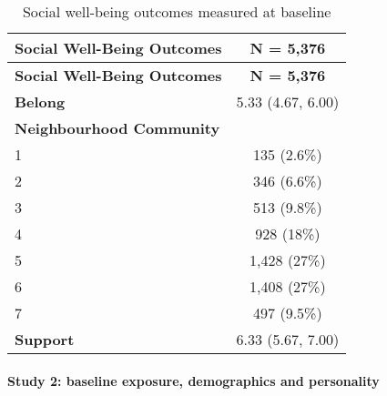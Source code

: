 \documentclass[
  singlecolumn,
  9pt]{article}
\let\oldparagraph\paragraph
\renewcommand{\paragraph}[1]{\oldparagraph{#1}\mbox{}}
\begin{document}
\hypertarget{tbl-table_social_vars_cats}{}
\begin{longtable}[]{@{}lc@{}}
\caption{\label{tbl-table_social_vars_cats}Social well-being outcomes
measured at baseline}\tabularnewline
\toprule\noalign{}
\textbf{Social Well-Being Outcomes} & \textbf{N = 5,376} \\
\midrule\noalign{}
\endfirsthead
\toprule\noalign{}
\textbf{Social Well-Being Outcomes} & \textbf{N = 5,376} \\
\midrule\noalign{}
\endhead
\bottomrule\noalign{}
\endlastfoot
\textbf{Belong} & 5.33 (4.67, 6.00) \\
\textbf{Neighbourhood Community} & \\
1 & 135 (2.6\%) \\
2 & 346 (6.6\%) \\
3 & 513 (9.8\%) \\
4 & 928 (18\%) \\
5 & 1,428 (27\%) \\
6 & 1,408 (27\%) \\
7 & 497 (9.5\%) \\
\textbf{Support} & 6.33 (5.67, 7.00) \\
\end{longtable}

\paragraph{Study 2: baseline exposure, demographics and
personality}\label{study-2-baseline-exposure-demographics-and-personality}
\end{document}

